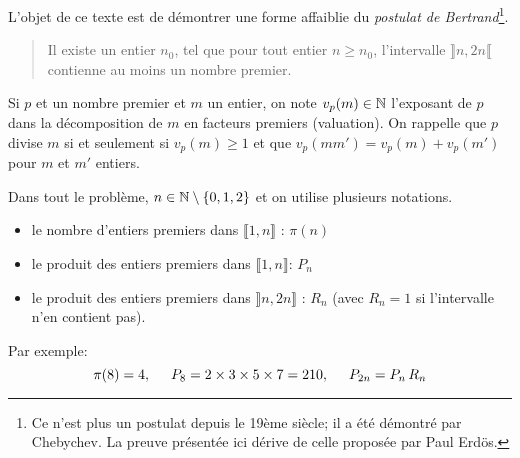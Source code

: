 L'objet de ce texte est de démontrer une forme affaiblie du \emph{postulat de Bertrand}\footnote{Ce n'est plus un postulat depuis le 19ème siècle; il a été démontré par Chebychev. La preuve présentée ici dérive de celle proposée par Paul Erdös.}.
\begin{quotation}
Il existe un entier $n_0$, tel que pour tout entier $n\geq n_0$, l'intervalle $\rrbracket n, 2n \llbracket$ contienne au moins un nombre premier.  
\end{quotation}

Si $p$ et un nombre premier et $m$ un entier, on note $v_p(m)\in \mathbb{N}$ l'exposant de $p$ dans la décomposition de $m$ en facteurs premiers (valuation). On rappelle que $p$ divise $m$ si et seulement si $v_p(m)\geq 1$ et que $v_p(mm') = v_p(m) + v_p(m')$ pour $m$ et $m'$ entiers.

Dans tout le problème, $n\in \mathbb{N}\setminus\left\lbrace 0,1, 2\right\rbrace$ et on utilise plusieurs notations. 
\begin{itemize}
  \item le nombre d'entiers premiers dans $\llbracket 1,n \rrbracket$ : $\pi(n)$ 
  \item le produit des entiers premiers dans $\llbracket 1,n \rrbracket$: $P_n$
  \item le produit des entiers premiers dans $\rrbracket n, 2n \rrbracket$ : $R_n$ (avec $R_n=1$ si l'intervalle n'en contient pas).
\end{itemize}
Par exemple:
\begin{displaymath}
\pi(8) = 4, \hspace{0.5cm} P_8 = 2\times 3 \times 5 \times 7 = 210, \hspace{0.5cm} P_{2n} = P_n \, R_n
\end{displaymath}


